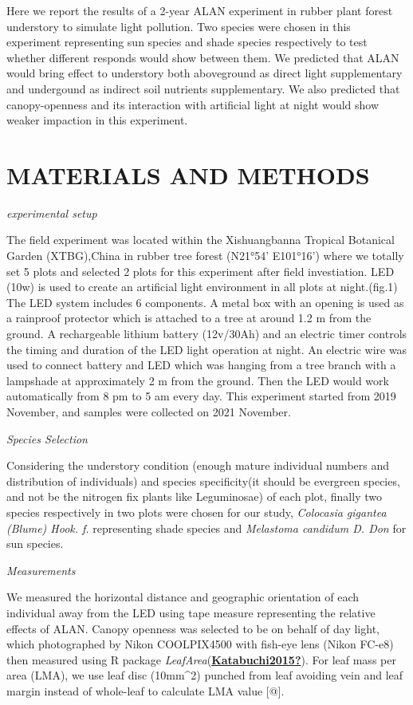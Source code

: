 \documentclass[
]{article}
\begin{document}
Here we report the results of a 2-year ALAN experiment in rubber plant
forest understory to simulate light pollution. Two species were chosen
in this experiment representing sun species and shade species
respectively to test whether different responds would show between them.
We predicted that ALAN would bring effect to understory both aboveground
as direct light supplementary and undergound as indirect soil nutrients
supplementary. We also predicted that canopy-openness and its
interaction with artificial light at night would show weaker impaction
in this experiment.

\hypertarget{materials-and-methods}{%
\section{MATERIALS AND METHODS}\label{materials-and-methods}}

\emph{experimental setup}

The field experiment was located within the Xishuangbanna Tropical
Botanical Garden (XTBG),China in rubber tree forest (N21°54' E101°16')
where we totally set 5 plots and selected 2 plots for this experiment
after field investiation. LED (10w) is used to create an artificial
light environment in all plots at night.(fig.1) The LED system includes
6 components. A metal box with an opening is used as a rainproof
protector which is attached to a tree at around 1.2 m from the ground. A
rechargeable lithium battery (12v/30Ah) and an electric timer controls
the timing and duration of the LED light operation at night. An electric
wire was used to connect battery and LED which was hanging from a tree
branch with a lampshade at approximately 2 m from the ground. Then the
LED would work automatically from 8 pm to 5 am every day. This
experiment started from 2019 November, and samples were collected on
2021 November.

\emph{Species Selection}

Considering the understory condition (enough mature individual numbers
and distribution of individuals) and species specificity(it should be
evergreen species, and not be the nitrogen fix plants like Leguminosae)
of each plot, finally two species respectively in two plots were chosen
for our study, \emph{Colocasia gigantea (Blume) Hook. f.} representing
shade species and \emph{Melastoma candidum D. Don} for sun species.

\emph{Measurements}

We measured the horizontal distance and geographic orientation of each
individual away from the LED using tape measure representing the
relative effects of ALAN. Canopy openness was selected to be on behalf
of day light, which photographed by Nikon COOLPIX4500 with fish-eye lens
(Nikon FC-e8) then measured using R package
\emph{LeafArea}(\protect\hyperlink{ref-Katabuchi2015}{\textbf{Katabuchi2015?}}).
For leaf mass per area (LMA), we use leaf disc (10mm\^{}2) punched from
leaf avoiding vein and leaf margin instead of whole-leaf to calculate
LMA value {[}@{]}.
\end{document}
